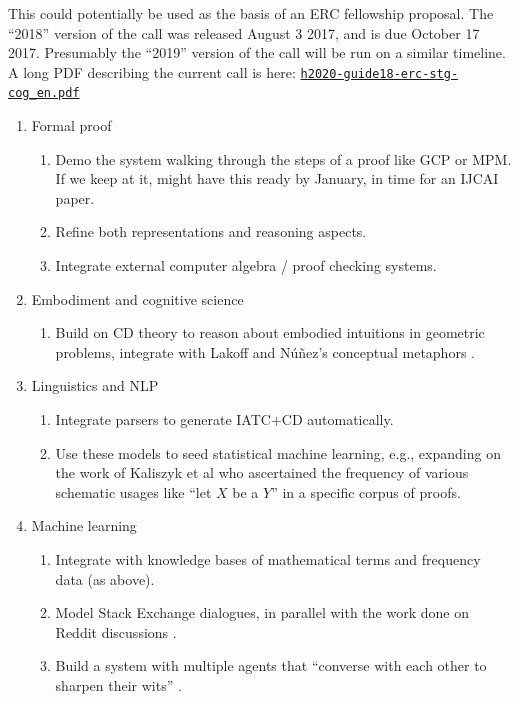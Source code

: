 \documentclass[11pt]{article}
\begin{document}
This could potentially be used as the basis of an ERC fellowship
proposal.  The ``2018'' version of the call was released August 3 2017,
and is due October 17 2017.  Presumably the ``2019'' version of the call
will be run on a similar timeline.  A long PDF describing the current
call is here: \href{http://ec.europa.eu/research/participants/data/ref/h2020/other/guides\_for\_applicants/h2020-guide18-erc-stg-cog\_en.pdf}{\texttt{h2020-guide18-erc-stg-cog\_en.pdf}}

\begin{enumerate}
\item Formal proof
\label{sec:orgf4eab2b}
\begin{enumerate}
\item Demo the system walking through the steps of a proof like GCP or MPM.
\label{sec:org9d183e9}
If we keep at it, might have this ready by January, in time for an
IJCAI paper.
\item Refine both representations and reasoning aspects.
\label{sec:org1401594}
\item Integrate external computer algebra / proof checking systems.
\label{sec:org343c8d1}
\end{enumerate}
\item Embodiment and cognitive science
\label{sec:orgcb26a6f}
\begin{enumerate}
\item Build on CD theory to reason about embodied intuitions in geometric problems, integrate with Lakoff and Núñez's conceptual metaphors \cite{kaliszyk2014developing-misc}.
\label{sec:org037b9ce}
\end{enumerate}
\item Linguistics and NLP
\label{sec:org051b365}
\begin{enumerate}
\item Integrate parsers to generate IATC+CD automatically.
\label{sec:orga58bba5}
\item Use these models to seed statistical machine learning, e.g., expanding on the work of Kaliszyk et al who ascertained the frequency of various schematic usages like ``let \(X\) be a \(Y\)'' in a specific corpus of proofs.
\label{sec:orgaad699f}
\end{enumerate}
\item Machine learning
\label{sec:orgd5efea0}
\begin{enumerate}
\item Integrate with knowledge bases of mathematical terms and frequency data (as above).
\label{sec:org37d2ffc}
\item Model Stack Exchange dialogues, in parallel with the work done  on Reddit discussions \cite{zhang2017characterizing}.
\label{sec:org59164d7}
\item Build a system with multiple agents that ``converse with each other to sharpen their wits'' \cite{heretical-theory}.
\label{sec:org72d9387}
\end{enumerate}
\end{enumerate}
\end{document}
